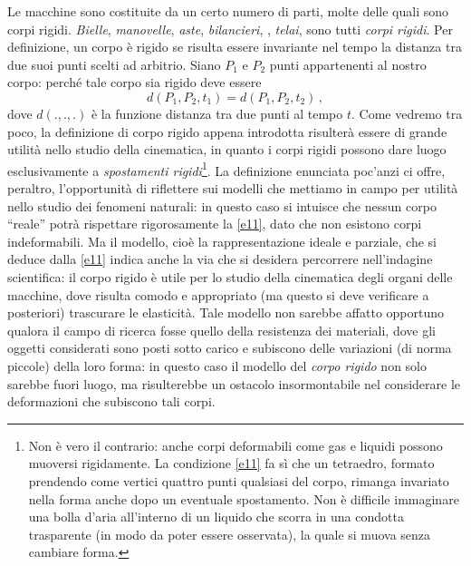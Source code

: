 Le macchine sono costituite da un certo numero di parti, molte delle
quali 
sono corpi rigidi. {\em Bielle},   {\em manovelle}, 
{\em aste}, {\em bilancieri}, ,
 {\em telai},  sono tutti {\em corpi rigidi}. 
Per definizione, un corpo \`e rigido  se risulta essere 
invariante nel tempo la distanza tra due suoi punti scelti ad arbitrio. Siano $P_1$ e $P_2$
punti appartenenti al nostro corpo: perch\'e tale corpo sia rigido deve essere
\begin{equation}
	d(P_1, P_2, t_1) = d(P_1, P_2,t_2)\,,
	\label{e11}
\end{equation}
\noindent dove $d(.,.,.)$ \`e la funzione distanza tra due punti al tempo $t$.
Come vedremo tra poco, la
definizione di corpo rigido appena introdotta
risulter\`a essere di grande utilit\`a
nello studio della cinematica, in quanto i corpi rigidi possono dare luogo
esclusivamente a {\em spostamenti rigidi}\footnote{
	Non \`e vero il contrario: anche corpi deformabili come gas e liquidi possono muoversi rigidamente. 
La condizione \ref{e11} fa s\`i che un tetraedro, formato prendendo
come vertici quattro punti qualsiasi del corpo, rimanga invariato
nella forma
anche dopo un eventuale spostamento.
Non \`e difficile immaginare una
bolla d'aria all'interno di un liquido che scorra in
una condotta trasparente (in modo da poter essere osservata), la quale si muova
senza cambiare forma.
}.
\noindent La definizione enunciata poc'anzi ci offre, peraltro, l'opportunit\`a di riflettere sui modelli che mettiamo
in campo per utilit\`a nello studio dei fenomeni naturali: in questo caso
si intuisce che nessun corpo ``reale'' potr\`a
rispettare rigorosamente la \ref{e11},
dato che non esistono corpi indeformabili.
Ma il modello, cio\`e la rappresentazione
ideale e parziale, che si deduce dalla \ref{e11} indica anche la via che si desidera
percorrere nell'indagine scientifica: il corpo rigido \`e utile per
lo studio della cinematica
degli organi delle macchine, dove risulta comodo e appropriato (ma questo si deve verificare 
a posteriori) trascurare le elasticit\`a.
Tale modello non sarebbe affatto opportuno 
qualora il campo di ricerca
fosse quello della resistenza dei materiali, dove gli oggetti considerati sono
posti sotto carico
e subiscono delle variazioni (di norma piccole) della loro forma:
in questo caso il modello del {\em corpo rigido} non
solo sarebbe fuori luogo, ma risulterebbe un 
ostacolo insormontabile nel considerare le deformazioni che subiscono tali corpi.

